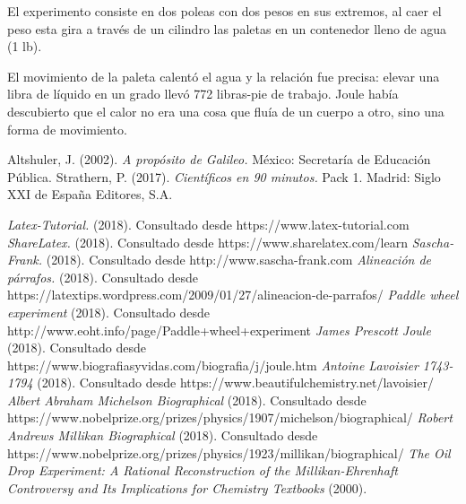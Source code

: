 \documentclass[letterpaper, 10pt, journal]{IEEEtran}
\begin{document}
El experimento consiste en dos poleas con dos pesos en sus extremos, al caer el peso esta gira a través de un cilindro las paletas en un contenedor lleno de agua (1 lb).

El movimiento de la paleta calentó el agua y la relación fue precisa: elevar una libra de líquido en un grado llevó 772 libras-pie de trabajo. Joule había descubierto que el calor no era una cosa que fluía de un cuerpo a otro, sino una forma de movimiento.

\begin{thebibliography}{1}
\bibitem{[1]} Altshuler, J. (2002). \emph{A propósito de Galileo.} México: Secretaría de Educación Pública.
\bibitem{[2]} Strathern, P. (2017). \emph{Científicos en 90 minutos.} Pack 1. Madrid: Siglo XXI de España Editores, S.A. 

 \emph{Latex-Tutorial.} (2018). Consultado desde https://www.latex-tutorial.com
 \emph{ShareLatex.} (2018). Consultado desde https://www.sharelatex.com/learn
 \emph{Sascha-Frank.} (2018). Consultado desde http://www.sascha-frank.com
\bibitem{[7]} \emph{Alineación de párrafos.} (2018). Consultado desde https://latextips.wordpress.com/2009/01/27/alineacion-de-parrafos/
 \emph{Paddle wheel experiment} (2018). Consultado desde http://www.eoht.info/page/Paddle+wheel+experiment
 \emph{James Prescott Joule} (2018). Consultado desde 
https://www.biografiasyvidas.com/biografia/j/joule.htm
 \emph{Antoine Lavoisier 1743-1794} (2018). Consultado desde https://www.beautifulchemistry.net/lavoisier/
 \emph{Albert Abraham Michelson Biographical} (2018). Consultado desde https://www.nobelprize.org/prizes/physics/1907/michelson/biographical/
 \emph{Robert Andrews Millikan Biographical} (2018). Consultado desde https://www.nobelprize.org/prizes/physics/1923/millikan/biographical/
 \emph{The Oil Drop Experiment: A Rational Reconstruction of the Millikan-Ehrenhaft Controversy and Its Implications for Chemistry Textbooks} (2000).
\end{thebibliography}
\end{document}
